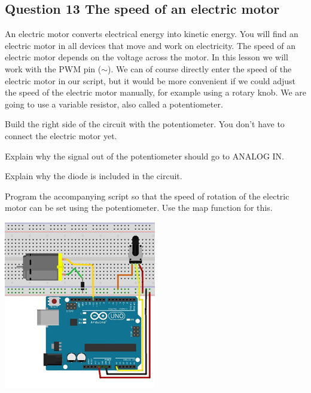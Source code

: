 \documentclass{arduino}
\begin{document}
\newpage

\subsection{Question 13 The speed of an electric motor}



An electric motor converts electrical energy into kinetic energy. You will find an electric motor in all devices that move and work on electricity. The speed of an electric motor depends on the voltage across the motor. In this lesson we will work with the PWM pin ($\sim$). We can of course directly enter the speed of the electric motor in our script, but it would be more convenient if we could adjust the speed of the electric motor manually, for example using a rotary knob. We are going to use a variable resistor, also called a potentiometer.

\begin{alphalist}
\item Build the right side of the circuit with the potentiometer. You don't have to connect the electric motor yet.

\item Explain why the signal out of the potentiometer should go to ANALOG IN.

\item Explain why the diode is included in the circuit.

\item Program the accompanying script so that the speed of rotation of the electric motor can be set using the potentiometer. Use the map function for this.
\end{alphalist}

\begin{center}
\includegraphics[width=0.8\linewidth]{29. Circuit motor control}
\end{center}
\end{document}
